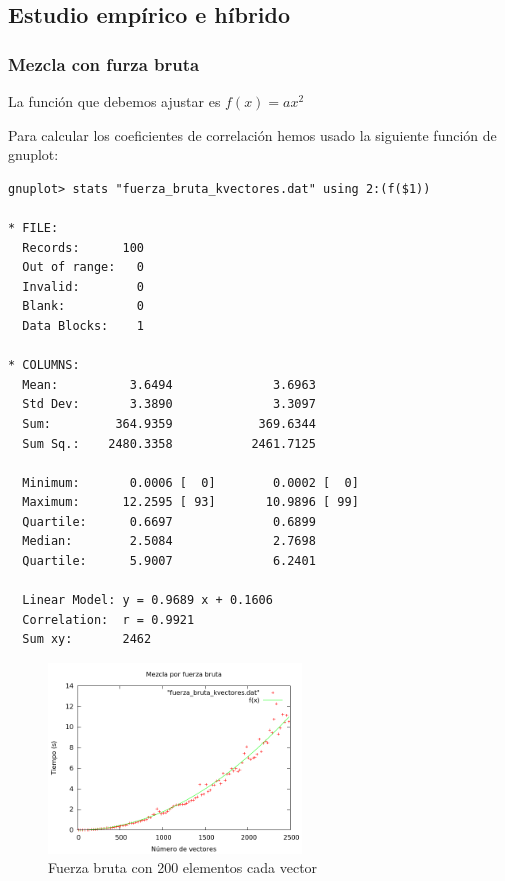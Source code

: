 \newpage

\subsection{Estudio emp\'irico e h\'ibrido}
\subsubsection{Mezcla con furza bruta}
La funci\'on que debemos ajustar es $f(x) = ax^2$

\begin{center}
\end{center}

Para calcular los coeficientes de correlaci\'on hemos usado la siguiente funci\'on de gnuplot:

\begin{lstlisting}[language=gnuplot]
gnuplot> stats "fuerza_bruta_kvectores.dat" using 2:(f($1))

* FILE: 
  Records:      100
  Out of range:   0
  Invalid:        0
  Blank:          0
  Data Blocks:    1

* COLUMNS:
  Mean:          3.6494              3.6963
  Std Dev:       3.3890              3.3097
  Sum:         364.9359            369.6344
  Sum Sq.:    2480.3358           2461.7125

  Minimum:       0.0006 [  0]        0.0002 [  0]
  Maximum:      12.2595 [ 93]       10.9896 [ 99]
  Quartile:      0.6697              0.6899
  Median:        2.5084              2.7698
  Quartile:      5.9007              6.2401

  Linear Model: y = 0.9689 x + 0.1606
  Correlation:  r = 0.9921
  Sum xy:       2462

\end{lstlisting}

\begin{figure}[htb] 
\centering
	\includegraphics[width=0.6\textwidth]{../Obligatorio/Graficas/fuerza_bruta_kvectores.png}
	\caption{Fuerza bruta con 200 elementos cada vector} 
	\label{fig:f_kvectores} 
\end{figure}

